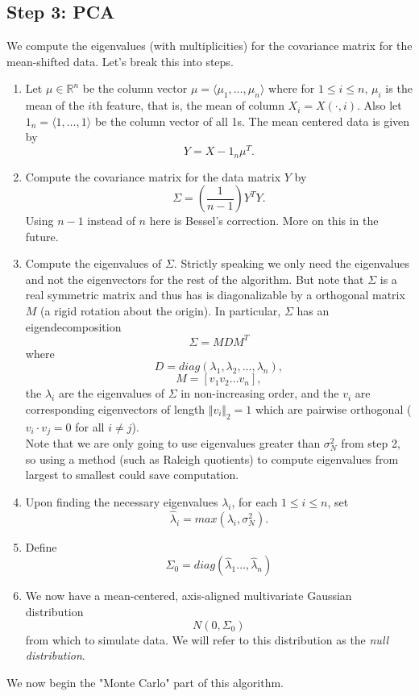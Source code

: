\documentclass{article}
\begin{document}
\subsection{Step 3: PCA }
We compute the eigenvalues (with multiplicities) for the covariance matrix for the mean-shifted data.  Let's break this into steps.
\begin{enumerate}

\item
Let $\mu \in \mathbb{R}^{n}$ be the column vector $\mu = \langle \mu_{1}, \ldots, \mu_{n}\rangle$ where for $1\leq i \leq n$, $\mu_i$ is the mean of the $i$th feature, that is, the mean of column $X_i = X(\cdot, i)$.  
Also let $1_{n} = \langle1, \dots, 1 \rangle$ be the column vector of all 1s. The mean centered data is given by
$$Y = X - 1_{n} \mu^{T}.$$

\item Compute the covariance matrix for the data matrix $Y$ by 
$$\Sigma = \left(\frac{1}{n-1}\right)Y^{T}Y.$$  Using $n-1$ instead of $n$ here is Bessel's correction.  More on this in the future.

\item Compute the eigenvalues of $\Sigma$.  Strictly speaking we only need the eigenvalues and not the eigenvectors for the rest of the algorithm.  But note that $\Sigma$ is a real symmetric matrix and thus has is diagonalizable by a orthogonal matrix $M$ (a rigid rotation about the origin).  In particular, $\Sigma$ has an eigendecomposition
$$\Sigma = MDM^{T}$$ where 
$$D = diag(\lambda_{1}, \lambda_{2}, \ldots, \lambda_{n}),$$
$$M = [v_1 v_2 \ldots v_n],$$
the $\lambda_{i}$ are the eigenvalues of $\Sigma$ in non-increasing order, and the $v_i$ are corresponding eigenvectors of length $\Vert v_{i} \Vert_{2} = 1$ which are pairwise orthogonal ($v_i \cdot v_j = 0$ for all $i\neq j$).\\
\indent Note that we are only going to use eigenvalues greater than $\sigma^2_{N}$ from step 2, so using a method (such as Raleigh quotients) to compute eigenvalues from largest to smallest could save computation.

\item Upon finding the necessary eigenvalues $\lambda_{i}$, for each $1\leq i \leq n$, set $$\hat{\lambda}_{i} = max(\lambda_{i}, \sigma_{N}^{2}).$$

\item Define $$\Sigma_{0} = diag(\hat{\lambda}_{1}\ldots, \hat{\lambda}_{n})$$

\item We now have a mean-centered, axis-aligned multivariate Gaussian distribution $$N(0, \Sigma_{0})$$ from which to simulate data. We will refer to this distribution as the \emph{null distribution}.

\end{enumerate}
We now begin the "Monte Carlo" part of this algorithm.
\end{document}
